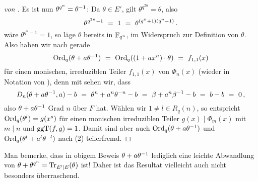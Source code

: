 \begin{proof}[von ]
  Es ist nun $\theta^{q^n} = \theta^{-1}$: 
  Da $\theta \in E'$, gilt $\theta^{q^{2n}} = \theta$, also
  \[ \theta^{q^{2n}-1} \ =\  1 \ =\  \theta^{(q^n+1)(q^n-1)}\,. \]
  wäre $\theta^{q^n-1} = 1$, so läge $\theta$ bereits in $\mathbb{F}_{q^n}$, im Widerspruch
  zur Definition von $\theta$.
  Also haben wir nach  
  gerade 
  \[ \operatorname{Ord}_q(\theta + a\theta^{-1}) \ =\ 
    \operatorname{Ord}_q((1+ax^n)\cdot \theta) \ =\  f_{1,1}(x)\]
  für einen monischen, irreduziblen Teiler $f_{1,1}(x)$ von $\Phi_n(x)$
  (wieder in Notation von ), denn
  mit  sehen wir, dass
  \[ D_n(\theta + a\theta^{-1},a) -b \ =\  \theta^n + a^n\theta^{-n} -b
    \ =\  \beta +a^n\beta^{-1} -b \ =\  b - b\ =\  0\,,\]
  also $\theta + a\theta^{-1}$ Grad $n$ über $F$ hat.
  Wählen wir $1 \neq l \in R_q(n)$, so entspricht 
  $\operatorname{Ord}_q(\theta^l) = g(x^s)$ für einen monischen irreduziblen Teiler 
  $g(x) \mid \Phi_m(x)$ mit $m\mid n$ und $\operatorname{ggT}(f,g) = 1$. Damit sind aber 
  auch $\operatorname{Ord}_q(\theta+a\theta^{-1})$ und $\operatorname{Ord}_q(\theta^l+a^l\theta^{-l})$ 
  nach  (2) teilerfremd.
\end{proof}


\begin{bemerkung}
  Man bemerke, dass in obigem Beweis $\theta + a\theta^{-1}$ lediglich eine
  leichte Abwandlung von $\theta + \theta^{q^n} = \operatorname{Tr}_{E'\mid E}(\theta)$ ist!
  Daher ist das Resultat vielleicht auch nicht besonders überraschend.
\end{bemerkung}
